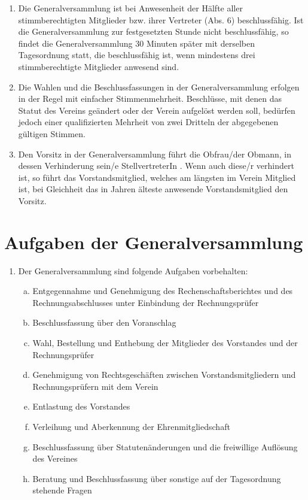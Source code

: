 \documentclass[a4paper,12pt]{article}
\newcommand{\comment}[1]{{\bf /*Komm.:} \textit{#1} {\bf */}}
\def\comment#1{}
\newcommand{\sein}{sein/e }
\newcommand{\stv}{StellvertreterIn }
\newcommand{\dieser}{diese/r }
\begin{document}
\begin{enumerate}
\item Die Generalversammlung ist bei Anwesenheit der Hälfte aller stimmberechtigten Mitglieder bzw. ihrer Vertreter (Abs. 6) beschlussfähig.
Ist die Generalversammlung zur festgesetzten Stunde nicht beschlussfähig, so findet die Generalversammlung 30 Minuten später mit derselben Tagesordnung statt,
die beschlussfähig ist, wenn mindestens drei stimmberechtigte Mitglieder anwesend sind.

\item Die Wahlen und die Beschlussfassungen in der Generalversammlung erfolgen in der Regel mit einfacher Stimmenmehrheit. Beschlüsse, mit denen das Statut des Vereins geändert oder der Verein aufgelöst werden soll, bedürfen jedoch einer qualifizierten Mehrheit von zwei Dritteln der abgegebenen gültigen Stimmen.
\comment{Hier geht es um Mehrheit bei Entscheidungen in der Generalversammlung}

\item Den Vorsitz in der Generalversammlung führt die Obfrau/der Obmann, in dessen Verhinderung \sein \stv. Wenn auch \dieser verhindert ist, so führt das Vorstandsmitglied, welches am längsten im Verein Mitglied ist, bei Gleichheit das in Jahren älteste anwesende Vorstandsmitglied den Vorsitz.

\end{enumerate}

\section{Aufgaben der Generalversammlung} %
\begin{enumerate}
\item Der Generalversammlung sind folgende Aufgaben vorbehalten:
	\begin{enumerate}[(a)]
	\item Entgegennahme und Genehmigung des Rechenschaftsberichtes und des Rechnungsabschlusses unter Einbindung der Rechnungsprüfer
	\item Beschlussfassung über den Voranschlag
	\item Wahl, Bestellung und Enthebung der Mitglieder des Vorstandes und der Rechnungsprüfer
	\item Genehmigung von Rechtsgeschäften zwischen Vorstandsmitgliedern und Rechnungsprüfern mit dem Verein
	\item Entlastung des Vorstandes
	\item Verleihung und Aberkennung der Ehrenmitgliedschaft
	\item Beschlussfassung über Statutenänderungen und die freiwillige Auflösung des Vereines
	\item Beratung und Beschlussfassung über sonstige auf der Tagesordnung stehende Fragen
	\end{enumerate}
\end{enumerate}
\end{document}
